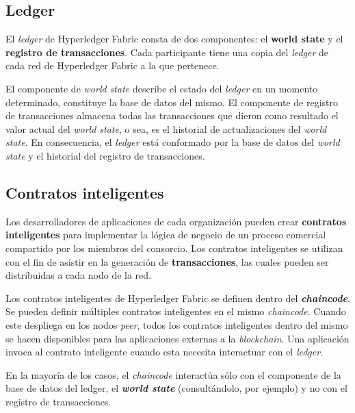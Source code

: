 
\subsection{Ledger}

El \textit{ledger} de Hyperledger Fabric consta de dos componentes: el \textbf{world state} y el \textbf{registro de transacciones}. Cada participante tiene una copia del \textit{ledger} de cada red de Hyperledger Fabric a la que pertenece.

El componente de \textit{world state} describe el estado del \textit{ledger} en un momento determinado, constituye la base de datos del mismo. El componente de registro de transacciones almacena todas las transacciones que dieron como resultado el valor actual del \textit{world state}, o sea, es el historial de actualizaciones del \textit{world state}. En consecuencia, el \textit{ledger} está conformado por la base de datos del \textit{world state} y el historial del registro de transacciones.

\subsection{Contratos inteligentes}

Los desarrolladores de aplicaciones de cada organización pueden crear \textbf{contratos inteligentes }para implementar la lógica de negocio de un proceso comercial compartido por los miembros del consorcio. Los contratos inteligentes se utilizan con el fin de asistir en la generación de \textbf{transacciones}, las cuales pueden ser distribuidas a cada nodo de la red.

Los contratos inteligentes de Hyperledger Fabric se definen dentro del \textbf{\textit{chaincode}}. Se pueden definir múltiples contratos inteligentes en el mismo \textit{chaincode}. Cuando este despliega en los nodos \textit{peer}, todos los contratos inteligentes dentro del mismo se hacen disponibles para las aplicaciones externas a la \textit{blockchain}. Una aplicación  invoca al contrato inteligente cuando esta necesita interactuar con el \textit{ledger}. 

En la mayoría de los casos, el \textit{chaincode} interactúa sólo con el componente de la base de datos del ledger, el \textbf{\textit{world state}} (consultándolo, por ejemplo) y no con el registro de transacciones.

